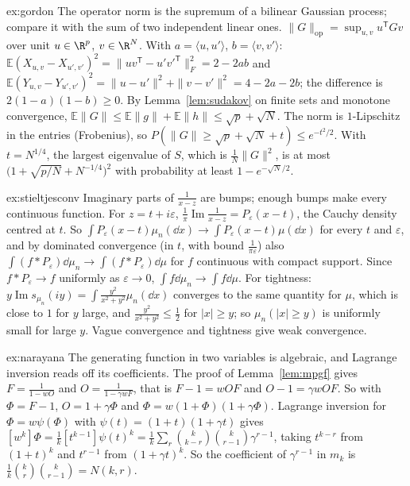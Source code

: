 \begin{solution}{ex:gordon}
\idea The operator norm is the supremum of a bilinear Gaussian process; compare it with the sum of two independent linear ones.
\writeup $\|G\|_{\mathrm{op}}=\sup_{u,v}u^{\mathsf T}Gv$ over unit $u\in\R^p$, $v\in\R^N$. With $a=\langle u,u'\rangle$, $b=\langle v,v'\rangle$: $\mathbb E(X_{u,v}-X_{u',v'})^2=\|uv^{\mathsf T}-u'v'^{\mathsf T}\|_F^2=2-2ab$ and
$\mathbb E(Y_{u,v}-Y_{u',v'})^2=\|u-u'\|^2+\|v-v'\|^2=4-2a-2b$; the difference is $2(1-a)(1-b)\ge0$. By Lemma~\ref{lem:sudakov} on finite sets and monotone convergence, $\mathbb E\|G\|\le\mathbb E\|g\|+\mathbb E\|h\|\le\sqrt p+\sqrt N$. The norm is
$1$-Lipschitz in the entries (Frobenius), so $P(\|G\|\ge\sqrt p+\sqrt N+t)\le e^{-t^2/2}$. With $t=N^{1/4}$, the largest eigenvalue of $S$, which is $\frac1N\|G\|^2$, is at most $\bigl(1+\sqrt{p/N}+N^{-1/4}\bigr)^2$ with probability at least
$1-e^{-\sqrt N/2}$.
\end{solution}

\begin{solution}{ex:stieltjesconv}
\idea Imaginary parts of $\frac1{x-z}$ are bumps; enough bumps make every continuous function.
\writeup For $z=t+i\varepsilon$, $\frac1\pi\operatorname{Im}\frac1{x-z}=P_\varepsilon(x-t)$, the Cauchy density centred at $t$. So $\int P_\varepsilon(x-t)\mu_n(\dd x)\to\int P_\varepsilon(x-t)\mu(\dd x)$ for every $t$ and $\varepsilon$, and by dominated convergence (in $t$, with
bound $\frac1{\pi\varepsilon}$) also $\int(f*P_\varepsilon)\dd\mu_n\to\int(f*P_\varepsilon)\dd\mu$ for $f$ continuous with compact support. Since $f*P_\varepsilon\to f$ uniformly as $\varepsilon\to0$, $\int f\dd\mu_n\to\int f\dd\mu$. For tightness:
$y\operatorname{Im}s_{\mu_n}(iy)=\int\frac{y^2}{x^2+y^2}\mu_n(\dd x)$ converges to the same quantity for $\mu$, which is close to $1$ for $y$ large, and $\frac{y^2}{x^2+y^2}\le\frac12$ for $|x|\ge y$; so $\mu_n(|x|\ge y)$ is uniformly small
for large $y$. Vague convergence and tightness give weak convergence.
\end{solution}

\begin{solution}{ex:narayana}
\idea The generating function in two variables is algebraic, and Lagrange inversion reads off its coefficients.
\writeup The proof of Lemma~\ref{lem:mpgf} gives $F=\frac1{1-wO}$ and $O=\frac1{1-\gamma wF}$, that is $F-1=wOF$ and $O-1=\gamma wOF$. So with $\Phi=F-1$, $O=1+\gamma\Phi$ and $\Phi=w(1+\Phi)(1+\gamma\Phi)$. Lagrange inversion for $\Phi=w\psi(\Phi)$ with $\psi(t)=(1+t)(1+\gamma t)$ gives $[w^k]\Phi=\frac1k[t^{k-1}]\psi(t)^k=\frac1k\sum_{r}\binom k{k-r}\binom k{r-1}\gamma^{r-1}$, taking $t^{k-r}$ from $(1+t)^k$ and $t^{r-1}$ from
$(1+\gamma t)^k$. So the coefficient of $\gamma^{r-1}$ in $m_k$ is $\frac1k\binom kr\binom k{r-1}=N(k,r)$.
\end{solution}

